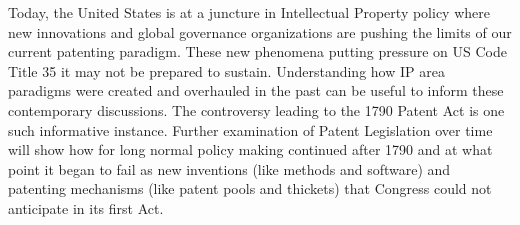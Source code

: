 \documentclass[12pt,letterpaper]{article}
\begin{document}
{Today, the United States is at a juncture in Intellectual Property policy where new innovations and global governance organizations are pushing the limits of our current patenting paradigm. These new phenomena putting pressure on US Code Title 35 it may not be prepared to sustain. Understanding how IP area paradigms were created and overhauled in the past can be useful to inform these contemporary discussions. The controversy leading to the 1790 Patent Act is one such informative instance. Further examination of Patent Legislation over time will show how for long normal policy making continued after 1790 and at what point it began to fail as new inventions (like methods and software) and patenting mechanisms (like patent pools and thickets) that Congress could not anticipate in its first Act.

}
\printbibliography
\end{document}
